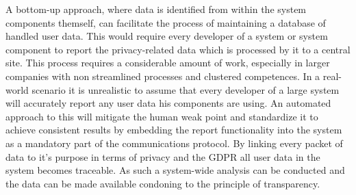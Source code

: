 A bottom-up approach, where data is identified from within the system components themself, can facilitate the process of maintaining a database of handled user data. This would require every developer of a system or system component to report the privacy-related data which is processed by it to a central site. This process requires a considerable amount of work, especially in larger companies with non streamlined processes and clustered competences. In a real-world scenario it is unrealistic to assume that every developer of a large system will accurately report any user data his components are using. An automated approach to this will mitigate the human weak point and standardize it to achieve consistent results by embedding the report functionality into the system as a mandatory part of the communications protocol. By linking every packet of data to it's purpose in terms of privacy and the GDPR all user data in the system becomes traceable. As such a system-wide analysis can be conducted and the data can be made available condoning to the principle of transparency.